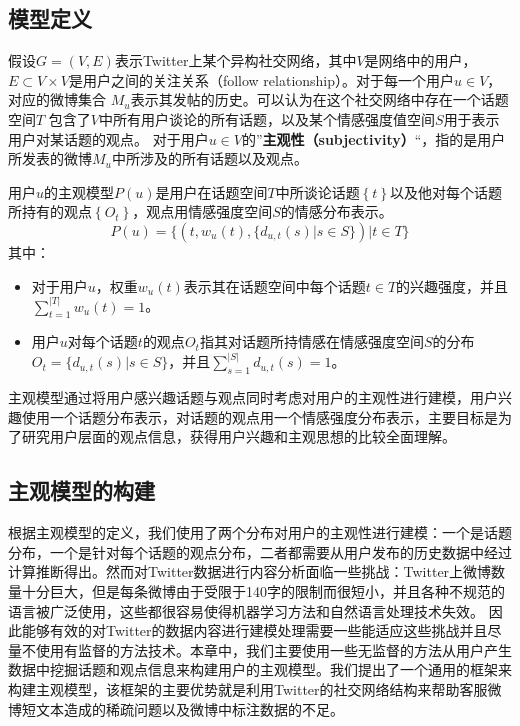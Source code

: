 \subsection{模型定义}
\label{definition}
假设$G=\left( V,E \right) $表示Twitter上某个异构社交网络，其中$ V $是网络中的用户，$ E\subset V\times V $是用户之间的关注关系（follow relationship）。对于每一个用户$ u \in V $，对应的微博集合 $ M_{u} $表示其发帖的历史。可以认为在这个社交网络中存在一个话题空间$ T $ 包含了$ V $中所有用户谈论的所有话题，以及某个情感强度值空间$ S $用于表示用户对某话题的观点。
对于用户$ u  \in V $的”\textbf{主观性（subjectivity）}“，指的是用户所发表的微博$ M_{u} $中所涉及的所有话题以及观点。
  
\begin{definition}[主观模型]
用户$ u $的主观模型$ P \left( u \right) $是用户在话题空间$T$中所谈论话题$\left\lbrace  t \right\rbrace $以及他对每个话题所持有的观点$\left\lbrace O_{t}\right\rbrace $，观点用情感强度空间$ S $的情感分布表示。
\begin{equation}
\label{usermodel}
P \left( u \right) = \lbrace \left( t, w_{u} \left( t \right), \lbrace d_{u,t} \left( s \right)|s \in S \rbrace \right) |  t \in T \rbrace
\end{equation}
其中：
\begin{itemize}
\item 对于用户$ u $，权重$ w_{u} \left( t \right)$表示其在话题空间中每个话题$t \in T$的兴趣强度，并且$ \sum_{t=1}^{|T|}w_{u} \left( t \right)=1 $。
\item 用户$ u $对每个话题$t$的观点$O_{t}$指其对话题所持情感在情感强度空间$ S $的分布$O_{t}=\lbrace d_{u,t} \left( s \right)|s \in S \rbrace $，并且$ \sum_{s=1}^{|S|} d_{u,t} \left( s \right)=1$。
\end{itemize}
\end{definition}

主观模型通过将用户感兴趣话题与观点同时考虑对用户的主观性进行建模，用户兴趣使用一个话题分布表示，对话题的观点用一个情感强度分布表示，主要目标是为了研究用户层面的观点信息，获得用户兴趣和主观思想的比较全面理解。

\subsection{主观模型的构建}
\label{establish}
根据主观模型的定义，我们使用了两个分布对用户的主观性进行建模：一个是话题分布，一个是针对每个话题的观点分布，二者都需要从用户发布的历史数据中经过计算推断得出。然而对Twitter数据进行内容分析面临一些挑战：Twitter上微博数量十分巨大，但是每条微博由于受限于140字的限制而很短小，并且各种不规范的语言被广泛使用，这些都很容易使得机器学习方法和自然语言处理技术失效。
因此能够有效的对Twitter的数据内容进行建模处理需要一些能适应这些挑战并且尽量不使用有监督的方法技术。本章中，我们主要使用一些无监督的方法从用户产生数据中挖掘话题和观点信息来构建用户的主观模型。我们提出了一个通用的框架来构建主观模型，该框架的主要优势就是利用Twitter的社交网络结构来帮助客服微博短文本造成的稀疏问题以及微博中标注数据的不足。

